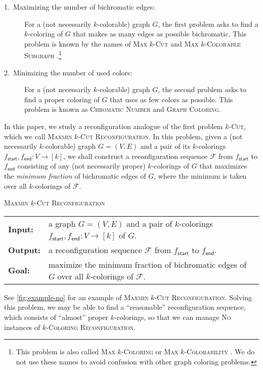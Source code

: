 \documentclass[11pt,fleqn]{article}
\newcommand{\prb}[1]{\textsc{#1}\xspace}
\newcommand{\sss}{\mathsf{start}}
\newcommand{\ttt}{\mathsf{end}}
\newcommand{\No}{\textsc{No}\xspace}
\newcommand{\f}{f}
\newcommand{\sqcol}{\scrF}
\newcommand{\kColReconf}{\prb{$k$-Coloring Reconfiguration}}
\newcommand{\MMkCutReconf}{\prb{Maxmin $k$-Cut Reconfiguration}}
\newcommand{\scrF}{\mathscr{F}}
\theoremstyle{definition}
\numberwithin{equation}{section}
\begin{document}
\begin{description}
    \item[1.~Maximizing the number of bichromatic edges:]
    For a (not necessarily $k$-colorable) graph $G$,
    the first problem asks to find a $k$-coloring of $G$
    that makes as many edges as possible bichromatic.
    This problem is known by the names of \prb{Max $k$-Cut} and \prb{Max $k$-Colorable Subgraph} \cite{papadimitriou1991optimization,guruswami2013improved}.\footnote{
        This problem is also called
        \prb{Max $k$-Coloring} \cite{austrin2014new,feige1998zero} or \prb{Max $k$-Colorability} \cite{petrank1994hardness}.
        We do not use these names to avoid confusion with other graph coloring problems.
    }
    \item[2.~Minimizing the number of used colors:]
    For a (not necessarily $k$-colorable) graph $G$,
    the second problem asks to find a proper coloring of $G$
    that uses as few colors as possible.
    This problem is known as \prb{Chromatic Number} and \prb{Graph Coloring}.
\end{description}
In this paper, we study a reconfiguration analogue of the first problem \prb{$k$-Cut}, which we call \MMkCutReconf.
In this problem, given a (not necessarily $k$-colorable) graph $G = (V,E)$ and a pair of its $k$-colorings $\f_\sss,\f_\ttt \colon V \to [k]$,
we shall construct a reconfiguration sequence $\sqcol$ from $\f_\sss$ to $\f_\ttt$
consisting of any (not necessarily proper) $k$-colorings of $G$
that maximizes the \emph{minimum fraction} of bichromatic edges of $G$,
where the minimum is taken over all $k$-colorings of $\sqcol$.


\begin{itembox}[l]{\MMkCutReconf}
\begin{tabular}{ll}
    \textbf{Input:}
    & a graph $G = (V,E)$ and
    a pair of $k$-colorings $\f_\sss,\f_\ttt \colon V \to [k]$ of $G$.
    \\
    \textbf{Output:}
    & a reconfiguration sequence $\sqcol$ from $\f_\sss$ to $\f_\ttt$.
    \\
    \textbf{Goal:}
    & maximize the minimum fraction of bichromatic edges of $G$ over all $k$-colorings of $\sqcol$.
\end{tabular}
\end{itembox}
See \cref{fig:example-no} for an example of \MMkCutReconf.
Solving this problem,
we may be able to find a ``reasonable'' reconfiguration sequence,
which consists of ``almost'' proper $k$-colorings, so that
we can manage \No instances of \kColReconf.
\end{document}
